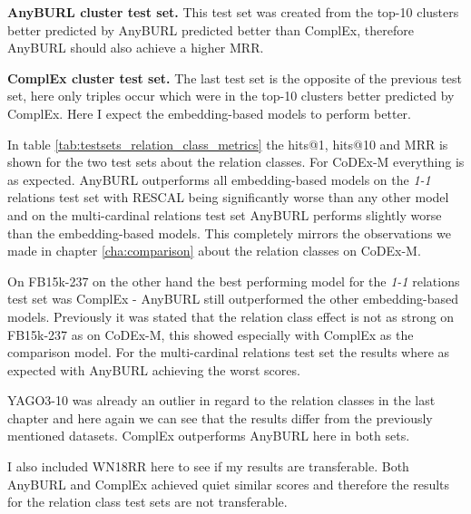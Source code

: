 \textbf{AnyBURL cluster test set.} This test set was created from the top-10 clusters better predicted by AnyBURL predicted better than ComplEx, therefore AnyBURL should also achieve a higher MRR. 

\textbf{ComplEx cluster test set.} The last test set is the opposite of the previous test set, here only triples occur which were in the top-10 clusters better predicted by ComplEx. Here I expect the embedding-based models to perform better. \newline 

In table \ref{tab:testsets_relation_class_metrics} the hits@1, hits@10 and MRR is shown for the two test sets about the relation classes. For CoDEx-M everything is as expected. AnyBURL outperforms all embedding-based models on the \textit{1-1} relations test set with RESCAL being significantly worse than any other model and on the multi-cardinal relations test set AnyBURL performs slightly worse than the embedding-based models. This completely mirrors the observations we made in chapter \ref{cha:comparison} about the relation classes on CoDEx-M.

On FB15k-237 on the other hand the best performing model for the \textit{1-1} relations test set was ComplEx - AnyBURL still outperformed the other embedding-based models. Previously it was stated that the relation class effect is not as strong on FB15k-237 as on CoDEx-M, this showed especially with ComplEx as the comparison model. For the multi-cardinal relations test set the results where as expected with AnyBURL achieving the worst scores. 

YAGO3-10 was already an outlier in regard to the relation classes in the last chapter and here again we can see that the results differ from the previously mentioned datasets. ComplEx outperforms AnyBURL here in both sets.

I also included WN18RR here to see if my results are transferable. Both AnyBURL and ComplEx achieved quiet similar scores and therefore the results for the relation class test sets are not transferable. 


